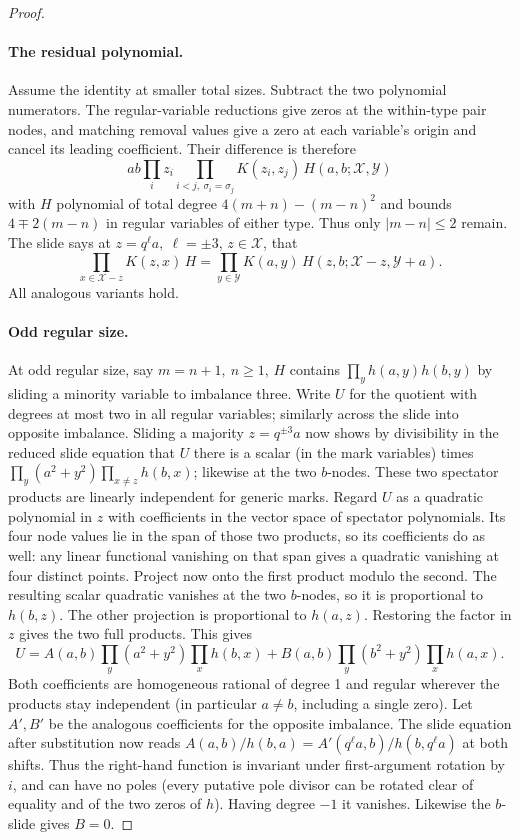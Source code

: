 \documentclass[11pt]{article}
\numberwithin{equation}{section}
\theoremstyle{definition}\newtheorem{definition}[theorem]{Definition}
\theoremstyle{remark}\newtheorem{remark}[theorem]{Remark}
\begin{document}
\begin{proof}
\paragraph{The residual polynomial.}
Assume the identity at smaller total sizes. Subtract the two polynomial
numerators. The regular-variable reductions give zeros at the within-type
pair nodes, and matching removal values give a zero at each variable's
origin and cancel its leading coefficient. Their difference is therefore
\[
 ab\prod_i z_i\prod_{i<j,\ \sigma_i=\sigma_j} K(z_i,z_j)\,H(a,b;\mathcal X,\mathcal Y)
\]
with \(H\) polynomial of total degree \(4(m+n)-(m-n)^2\) and bounds \(4\mp2(m-n)\) in regular variables of either type. Thus only \(|m-n|\le2\) remain. The slide says at \(z=q^{\ell}a,\ \ell=\pm3\), \(z\in\mathcal X\), that
\[
 \prod_{x\in\mathcal X-z}K(z,x)\,H=\prod_{y\in\mathcal Y}K(a,y)\,
                    H(z,b;\mathcal X-z,\mathcal Y+a).
\]
All analogous variants hold.

\paragraph{Odd regular size.}
At odd regular size, say \(m=n+1,\ n\ge1\), \(H\) contains \(\prod_{y}h(a,y)h(b,y)\) by sliding a minority variable to imbalance three. Write \(U\) for the quotient with degrees at most two in all regular variables; similarly across the slide into opposite imbalance. Sliding a majority \(z=q^{\pm3}a\) now shows by divisibility in the reduced slide equation that \(U\) there is a scalar (in the mark variables) times \(\prod_y(a^2+y^2)\prod_{x\ne z}h(b,x)\); likewise at the two \(b\)-nodes. These two spectator products are linearly independent for generic
marks. Regard $U$ as a quadratic polynomial in $z$ with coefficients in
the vector space of spectator polynomials. Its four node values lie in
the span of those two products, so its coefficients do as well: any
linear functional vanishing on that span gives a quadratic vanishing at
four distinct points. Project now onto the first product modulo the
second. The resulting scalar quadratic vanishes at the two $b$-nodes,
so it is proportional to $h(b,z)$. The other projection is proportional
to $h(a,z)$. Restoring the factor in $z$ gives the two full products. This gives
\[
 U=A(a,b)\prod_y(a^2+y^2)\prod_x h(b,x)+B(a,b)\prod_y(b^2+y^2)\prod_x h(a,x).
\]
Both coefficients are homogeneous rational of degree 1 and regular wherever the products stay independent (in particular \(a\ne b\), including a single zero). Let \(A',B'\) be the analogous coefficients for the opposite imbalance. The slide equation after substitution now reads \(A(a,b)/h(b,a)=A'(q^\ell a,b)/h(b,q^\ell a)\) at both shifts. Thus the right-hand function is invariant under first-argument rotation by \(i\), and can have no poles (every putative pole divisor can be rotated clear of equality and of the two zeros of \(h\)). Having degree \(-1\) it vanishes. Likewise the \(b\)-slide gives \(B=0\).


\end{proof}
\end{document}
